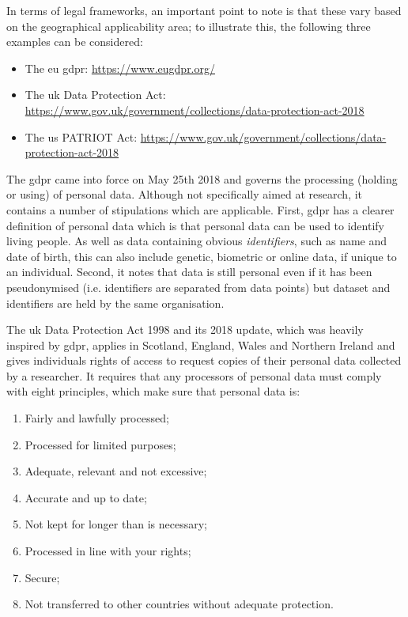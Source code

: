 In terms of legal frameworks, an important point to note is that these vary based on the geographical applicability area; to illustrate this, the following three examples can be considered:

\begin{itemize}
    \item The \gls{eu} \gls{gdpr}: \url{https://www.eugdpr.org/}
    \item The \gls{uk} Data Protection Act: \url{https://www.gov.uk/government/collections/data-protection-act-2018}
    \item The \gls{us} PATRIOT Act: \url{https://www.gov.uk/government/collections/data-protection-act-2018}
\end{itemize}

The \gls{gdpr} came into force on May 25th 2018 and governs the processing (holding or using) of personal data. Although not specifically aimed at research, it contains a number of stipulations which are applicable. First, \gls{gdpr} has a clearer definition of personal data which is that personal data can be used to identify living people. As well as data containing obvious \emph{identifiers}, such as name and date of birth, this can also include genetic, biometric or online data, if unique to an individual. Second, it notes that data is still personal even if it has been pseudonymised (i.e. identifiers are separated from data points) but dataset and identifiers are held by the same organisation.

The \gls{uk} Data Protection Act 1998 and its 2018 update, which was heavily inspired by \gls{gdpr}, applies in Scotland, England, Wales and Northern Ireland and gives individuals rights of access to request copies of their personal data collected by a researcher. It requires that any processors of personal data must comply with eight principles, which make sure that personal data is:

\begin{enumerate}
    \item Fairly and lawfully processed;
    \item Processed for limited purposes;
    \item Adequate, relevant and not excessive;
    \item Accurate and up to date;
    \item Not kept for longer than is necessary;
    \item Processed in line with your rights;
    \item Secure;
    \item Not transferred to other countries without adequate protection.
\end{enumerate}

